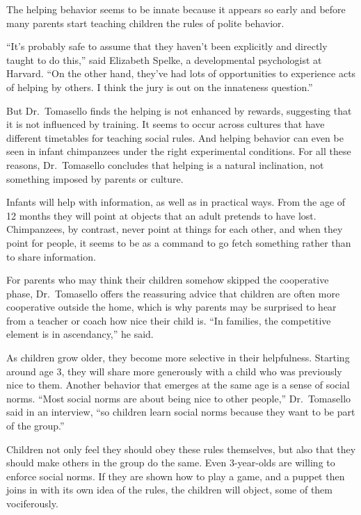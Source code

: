 ﻿\documentclass[12pt]{article}
\begin{document}
The helping behavior seems to be innate because it appears so early and before many parents start
teaching children the rules of polite behavior.

``It's probably safe to assume that they haven't been explicitly and directly taught to do this,''
said Elizabeth Spelke, a developmental psychologist at Harvard. ``On the other hand, they've had
lots of opportunities to experience acts of helping by others. I think the jury is out on the
innateness question.''

But Dr.~Tomasello finds the helping is not enhanced by rewards, suggesting that it is not influenced
by training. It seems to occur across cultures that have different timetables for teaching social
rules. And helping behavior can even be seen in infant chimpanzees under the right experimental
conditions. For all these reasons, Dr.~Tomasello concludes that helping is a natural inclination,
not something imposed by parents or culture.

Infants will help with information, as well as in practical ways. From the age of 12 months they
will point at objects that an adult pretends to have lost. Chimpanzees, by contrast, never point at
things for each other, and when they point for people, it seems to be as a command to go fetch
something rather than to share information.

For parents who may think their children somehow skipped the cooperative phase, Dr.~Tomasello offers
the reassuring advice that children are often more cooperative outside the home, which is why
parents may be surprised to hear from a teacher or coach how nice their child is. ``In families, the
competitive element is in ascendancy,'' he said.

As children grow older, they become more selective in their helpfulness. Starting around age 3, they
will share more generously with a child who was previously nice to them. Another behavior that
emerges at the same age is a sense of social norms. ``Most social norms are about being nice to
other people,'' Dr.~Tomasello said in an interview, ``so children learn social norms because they
want to be part of the group.''

Children not only feel they should obey these rules themselves, but also that they should make
others in the group do the same. Even 3-year-olds are willing to enforce social norms. If they are
shown how to play a game, and a puppet then joins in with its own idea of the rules, the children
will object, some of them vociferously.
\end{document}
